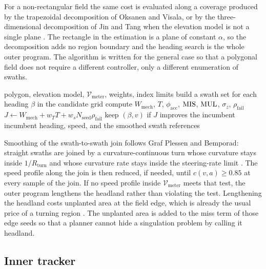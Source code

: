 For a non-rectangular field the same cost is evaluated along a coverage produced by the trapezoidal decomposition of Oksanen and Visala, or by the three-dimensional decomposition of Jin and Tang when the elevation model is not a single plane \cite{oksanen2009,jin2011}. The rectangle in the estimation is a plane of constant \(\alpha\), so the decomposition adds no region boundary and the heading search is the whole outer program. The algorithm is written for the general case so that a polygonal field does not require a different controller, only a different enumeration of swaths.

\begin{algorithm}[ht]
\caption{Heading and working-speed selection}
\label{alg:outer}
\begin{algorithmic}[1]
\Require polygon, elevation model, \(\mathcal{V}_{\mathrm{meter}}\), weights, index limits
\State build a swath set for each heading \(\beta\) in the candidate grid
  \State compute \(W_{\mathrm{mech}}\), \(T\), \(\phi_{\mathrm{acc}}\), \(\mathrm{MIS}\), \(\mathrm{MUL}\), \(\sigma_z\), \(\rho_{\mathrm{fail}}\)
    \State \(J \gets W_{\mathrm{mech}} + w_T T + w_s N_{\mathrm{seed}}\rho_{\mathrm{fail}}\)
    \State keep \((\beta,v)\) if \(J\) improves the incumbent
  \EndIf
\EndFor
\State \Return incumbent heading, speed, and the smoothed swath references
\end{algorithmic}
\end{algorithm}

Smoothing of the swath-to-swath join follows Graf Plessen and Bemporad: straight swaths are joined by a curvature-continuous turn whose curvature stays inside \(1/R_{\mathrm{turn}}\) and whose curvature rate stays inside the steering-rate limit \cite{plessen2017}. The speed profile along the join is then reduced, if needed, until \(c(v,a)\ge 0.85\) at every sample of the join. If no speed profile inside \(\mathcal{V}_{\mathrm{meter}}\) meets that test, the outer program lengthens the headland rather than violating the test. Lengthening the headland costs unplanted area at the field edge, which is already the usual price of a turning region \cite{bochtis2008}. The unplanted area is added to the miss term of those edge seeds so that a planner cannot hide a singulation problem by calling it headland.

\subsection{Inner tracker}

